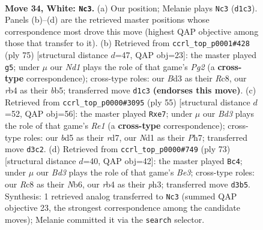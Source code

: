 \documentclass[11pt]{article}
\begin{document}
\clearpage

\begin{figure}[p]\centering
\begin{subfigure}{0.46\textwidth}\centering
\resizebox{\linewidth}{!}{%
\newchessgame
\chessboard[
  setfen={2R5/5pp1/4p2k/1p1b3p/1r1PnP1P/3BP1P1/8/3N2K1 w - - 6 34},
  showmover=false,
  pgfstyle=straightmove, color=movearrow, markmove={d1-c3}
]}
\caption{}
\end{subfigure}\hfill
\begin{subfigure}{0.46\textwidth}\centering
\resizebox{\linewidth}{!}{%
\newchessgame
\chessboard[
  setfen={2r5/5kp1/4p2p/pBN2p2/P2P1P1P/2b1K3/1n3P2/R7 b - - 9 38},
  showmover=false,
  pgfstyle=straightmove, color=movearrow, markmove={g7-g5}
]}
\caption{}
\end{subfigure}
\\[4pt]
\begin{subfigure}{0.46\textwidth}\centering
\resizebox{\linewidth}{!}{%
\newchessgame
\chessboard[
  setfen={4r2k/1p1RNp1p/p3pbp1/8/2P1n3/1P2BP2/P5PP/6K1 b - - 0 28},
  showmover=false,
  pgfstyle=straightmove, color=movearrow, markmove={e8-e7}
]}
\caption{}
\end{subfigure}\hfill
\begin{subfigure}{0.46\textwidth}\centering
\resizebox{\linewidth}{!}{%
\newchessgame
\chessboard[
  setfen={5k2/6p1/pn2bp1p/1p2pN2/1P6/P2BP2P/3K1PP1/8 b - - 5 37},
  showmover=false,
  pgfstyle=straightmove, color=movearrow, markmove={e6-c4}
]}
\caption{}
\end{subfigure}
\caption{\textbf{Move 34, White: \texttt{Nc3}.} (a) Our position; Melanie plays \texttt{Nc3} (\texttt{d1c3}). Panels (b)--(d) are the retrieved master positions whose correspondence most drove this move (highest QAP objective among those that transfer to it). (b) Retrieved from \texttt{ccrl\_top\_p0001\#428} (ply 75) [structural distance $d$=47, QAP obj=23]: the master played \texttt{g5}; under $\mu$ our \emph{Nd1} plays the role of that game's \emph{Pg2} (a \textbf{cross-type} correspondence); cross-type roles: our \emph{B}d3 as their \emph{R}c8, our \emph{r}b4 as their \emph{b}b5; transferred move \texttt{d1c3} \textbf{(endorses this move)}. (c) Retrieved from \texttt{ccrl\_top\_p0000\#3095} (ply 55) [structural distance $d$=52, QAP obj=56]: the master played \texttt{Rxe7}; under $\mu$ our \emph{Bd3} plays the role of that game's \emph{Re1} (a \textbf{cross-type} correspondence); cross-type roles: our \emph{b}d5 as their \emph{r}d7, our \emph{N}d1 as their \emph{P}h7; transferred move \texttt{d3c2}. (d) Retrieved from \texttt{ccrl\_top\_p0000\#749} (ply 73) [structural distance $d$=40, QAP obj=42]: the master played \texttt{Bc4}; under $\mu$ our \emph{Bd3} plays the role of that game's \emph{Be3}; cross-type roles: our \emph{R}c8 as their \emph{N}b6, our \emph{r}b4 as their \emph{p}h3; transferred move \texttt{d3b5}. Synthesis: 1 retrieved analog transferred to \texttt{Nc3} (summed QAP objective 23, the strongest correspondence among the candidate moves); Melanie committed it via the \texttt{search} selector.}
\label{fig:thought-m66}
\end{figure}
\end{document}
